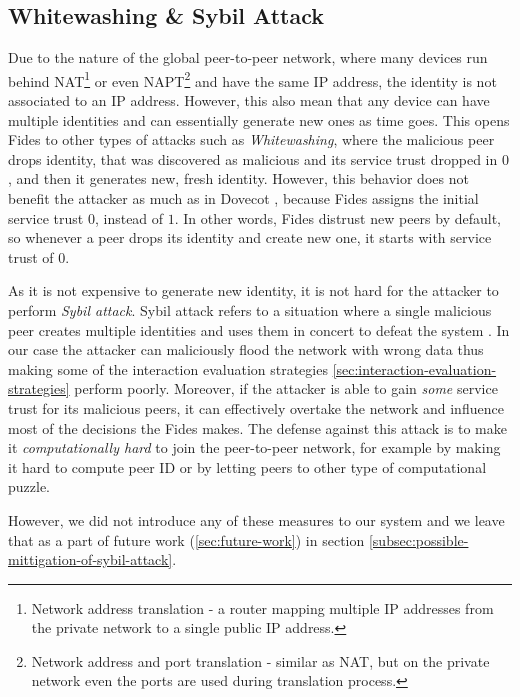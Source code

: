 \subsection{Whitewashing \& Sybil Attack}
\label{subsec:whitewashing-and-sybil-attack}
Due to the nature of the global peer-to-peer network, where many devices run behind NAT\footnote{Network address translation - a router mapping multiple IP addresses from the private network to a single public IP address.} or even NAPT\footnote{Network address and port translation - similar as NAT, but on the private network even the ports are used during translation process.} and have the same IP address, the identity is not associated to an IP address.
However, this also mean that any device can have multiple identities and can essentially generate new ones as time goes.
This opens Fides to other types of attacks such as \textit{Whitewashing}, where the malicious peer drops identity, that was discovered as malicious and its service trust dropped in $0$, and then it generates new, fresh identity.
However, this behavior does not benefit the attacker as much as in Dovecot \cite{dita}, because Fides assigns the initial service trust $0$, instead of $1$.
In other words, Fides distrust new peers by default, so whenever a peer drops its identity and create new one, it starts with service trust of $0$.

As it is not expensive to generate new identity, it is not hard for the attacker to perform \textit{Sybil attack}.
Sybil attack refers to a situation where a single malicious peer creates multiple identities and uses them in concert to defeat the system \cite{sybil}.
In our case the attacker can maliciously flood the network with wrong data thus making some of the interaction evaluation strategies \ref{sec:interaction-evaluation-strategies} perform poorly.
Moreover, if the attacker is able to gain \textit{some} service trust for its malicious peers, it can effectively overtake the network and influence most of the decisions the Fides makes.
The defense against this attack is to make it \textit{computationally hard} to join the peer-to-peer network, for example by making it hard to compute peer ID or by letting peers to other type of computational puzzle. 

However, we did not introduce any of these measures to our system and we leave that as a part of future work (\ref{sec:future-work}) in section \ref{subsec:possible-mittigation-of-sybil-attack}. 